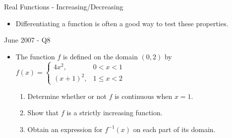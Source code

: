 \documentclass[10pt]{beamer}
\begin{document}
\begin{frame}{Real Functions - Increasing/Decreasing}

   {
    \begin{itemize}
    	\item  Differentiating a function is often a good way to test these properties.
    \end{itemize}
  }
\end{frame}

\begin{frame}{June 2007 - Q8}
    \begin{itemize}
    	\item The function $f$ is defined on the domain $(0,2)$ by 
    	$f(x) = \begin{cases} 4x^2, & 0 < x < 1 \\ (x+1)^2, &  1\leq x < 2 \end{cases}$ 
    	\begin{enumerate}
    		\item Determine whether or not $f$ is continuous when $x = 1$.
    		\item Show that $f$ is a strictly increasing function.
    		\item Obtain an expression for $f^{-1}(x)$ on each part of its domain.
    	\end{enumerate}
   	\end{itemize}
\end{frame}
\end{document}
